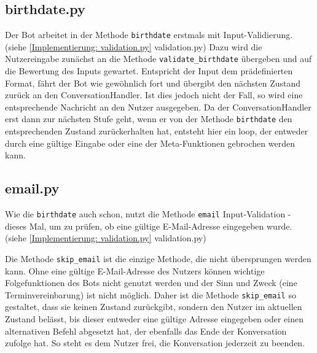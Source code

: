         

        \subsection{birthdate.py} \label{Implementierung: birthdate.py}
                Der Bot arbeitet in der Methode \verb|birthdate| erstmals mit Input-Validierung. (siehe \ref{Implementierung: validation.py} validation.py) Dazu wird die Nutzereingabe zunächst an die Methode \verb|validate_birthdate| übergeben und auf die Bewertung des Inputs gewartet. Entspricht der Input dem prädefinierten Format, fährt der Bot wie gewöhnlich fort und übergibt den nächsten Zustand zurück an den ConversationHandler. Ist dies jedoch nicht der Fall, so wird eine entsprechende Nachricht an den Nutzer ausgegeben. Da der ConversationHandler erst dann zur nächsten Stufe geht, wenn er von der Methode \verb|birthdate| den entsprechenden Zustand zurückerhalten hat, entsteht hier ein loop, der entweder durch eine gültige Eingabe oder eine der Meta-Funktionen gebrochen werden kann.
        
        
        \subsection{email.py} \label{Implementierung: email.py}
                Wie die \verb|birthdate| auch schon, nutzt die Methode \verb|email| Input-Validation - dieses Mal, um zu prüfen, ob eine gültige E-Mail-Adresse eingegeben wurde. (siehe \ref{Implementierung: validation.py} validation.py)

                Die Methode \verb|skip_email| ist die einzige Methode, die nicht übersprungen werden kann. Ohne eine gültige E-Mail-Adresse des Nutzers können wichtige Folgefunktionen des Bots nicht genutzt werden und der Sinn und Zweck (eine Terminvereinbarung) ist nicht möglich. Daher ist die Methode \verb|skip_email| so gestaltet, dass sie keinen Zustand zurückgibt, sondern den Nutzer im aktuellen Zustand belässt, bis dieser entweder eine gültige Adresse eingegeben oder einen alternativen Befehl abgesetzt hat, der ebenfalls das Ende der Konversation zufolge hat. So steht es dem Nutzer frei, die Konversation jederzeit zu beenden. 
        
